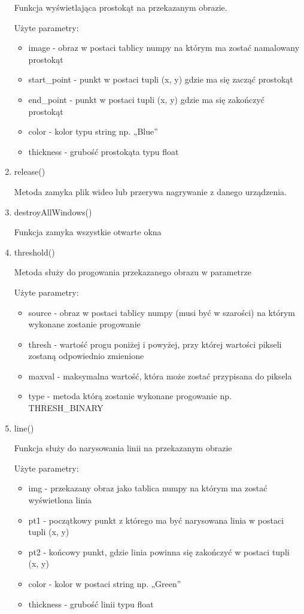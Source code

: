 \documentclass{article}
\begin{document}
\begin{enumerate}
Funkcja wyświetlająca prostokąt na przekazanym obrazie.

Użyte parametry:

\begin{itemize}
\item image - obraz w postaci tablicy numpy na którym ma zostać namalowany prostokąt
\item start\_point - punkt w postaci tupli (x, y) gdzie ma się zacząć prostokąt
\item end\_point - punkt w postaci tupli (x, y) gdzie ma się zakończyć prostokąt
\item color - kolor typu string np. „Blue”
\item thickness - grubość prostokąta typu float
\end{itemize}

\item release() \cite{opencv13}

Metoda zamyka plik wideo lub przerywa nagrywanie z danego urządzenia.

\item destroyAllWindows() \cite{opencv14}

Funkcja zamyka wszystkie otwarte okna

\item threshold() \cite{opencv15}

Metoda służy do progowania przekazanego obrazu w parametrze

Użyte parametry:

\begin{itemize}
\item source - obraz w postaci tablicy numpy (musi być w szarości) na którym wykonane zostanie progowanie
\item thresh - wartość progu poniżej i powyżej, przy której wartości pikseli zostaną odpowiednio zmienione
\item maxval - maksymalna wartość, która może zostać przypisana do piksela
\item type - metoda którą zostanie wykonane progowanie np. THRESH\_BINARY
\end{itemize}

\item line() \cite{opencv16}

Funkcja służy do narysowania linii na przekazanym obrazie

Użyte parametry:

\begin{itemize}
\item img - przekazany obraz jako tablica numpy na którym ma zostać wyświetlona linia
\item pt1 - początkowy punkt z którego ma być narysowana linia w postaci tupli (x, y)
\item pt2 - końcowy punkt, gdzie linia powinna się zakończyć w postaci tupli (x, y)
\item color - kolor w postaci string np. „Green”
\item thickness - grubość linii typu float
\end{itemize}

\end{enumerate}
\end{document}
